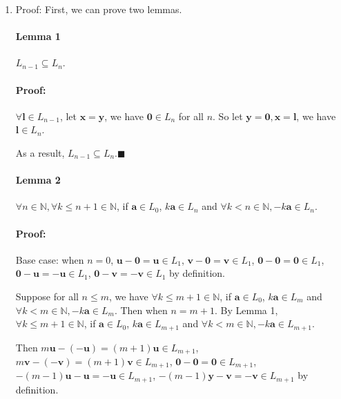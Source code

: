 \documentclass[11pt]{article}
\begin{document}
\begin{solution}
\begin{enumerate}[1.]
	\item Proof:
		First, we can prove two lemmas.
		\paragraph{Lemma 1}
			$L_{n - 1} \subseteq L_n$.
			
		\paragraph{Proof:} $\forall \mathbf{l} \in L_{n - 1}$, let $\mathbf{x} = \mathbf{y}$, we have $\mathbf{0} \in L_n$ for all $n$. So let $\mathbf{y} = \mathbf{0}, \mathbf{x} = \mathbf{l}$, we have $\mathbf{l} \in L_n$. 
		
		As a result, $L_{n - 1} \subseteq L_n$.$\blacksquare$
		
		\paragraph{Lemma 2}
			$\forall n \in \mathbb{N}, \forall k \leq n + 1 \in \mathbb{N}$, if $\mathbf{a} \in L_0$, $k\mathbf{a} \in L_n$ and $\forall k < n \in \mathbb{N}, -k\mathbf{a} \in L_n$.
			
		\paragraph{Proof:}
			Base case: when $n = 0$, $\mathbf{u} - \mathbf{0} = \mathbf{u} \in L_1$, $\mathbf{v} - \mathbf{0} = \mathbf{v} \in L_1$, $\mathbf{0} - \mathbf{0} = \mathbf{0} \in L_1$, $\mathbf{0} - \mathbf{u} = -\mathbf{u} \in L_1$, $\mathbf{0} - \mathbf{v} = -\mathbf{v} \in L_1$ by definition.
			
			Suppose for all $n \leq m$, we have $\forall k \leq m + 1 \in \mathbb{N}$, if $\mathbf{a} \in L_0$, $k\mathbf{a} \in L_m$ and $\forall k < m \in \mathbb{N}, -k\mathbf{a} \in L_m$. Then when $n = m + 1$. By Lemma 1, $\forall k \leq m + 1 \in \mathbb{N}$, if $\mathbf{a} \in L_{0}$, $k\mathbf{a} \in L_{m + 1}$ and $\forall k < m \in \mathbb{N}, -k\mathbf{a} \in L_{m + 1}$.
			
			Then $m\mathbf{u} - (-\mathbf{u}) = (m + 1)\mathbf{u} \in L_{m + 1}$, $m\mathbf{v} - (-\mathbf{v}) = (m + 1)\mathbf{v} \in L_{m + 1}$, $\mathbf{0} - \mathbf{0} = \mathbf{0} \in L_{m + 1}$, $-(m - 1)\mathbf{u} - \mathbf{u} = -\mathbf{u} \in L_{m + 1}$, $-(m - 1)\mathbf{y} - \mathbf{v} = -\mathbf{v} \in L_{m + 1}$ by definition.
			

\end{enumerate}
\end{solution}
\end{document}
